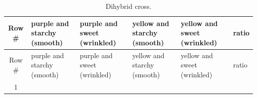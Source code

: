 \documentclass[]{book}
\theoremstyle{definition}
\theoremstyle{definition}
\theoremstyle{definition}
\theoremstyle{remark}
\begin{document}
\begin{longtable}[]{@{}clllll@{}}
\caption{\label{tab:di} Dihybrid cross.}\tabularnewline
\toprule
\begin{minipage}[b]{0.05\columnwidth}\centering\strut
Row \#\strut
\end{minipage} & \begin{minipage}[b]{0.19\columnwidth}\raggedright\strut
purple and starchy (smooth)\strut
\end{minipage} & \begin{minipage}[b]{0.19\columnwidth}\raggedright\strut
purple and sweet (wrinkled)\strut
\end{minipage} & \begin{minipage}[b]{0.19\columnwidth}\raggedright\strut
yellow and starchy (smooth)\strut
\end{minipage} & \begin{minipage}[b]{0.19\columnwidth}\raggedright\strut
yellow and sweet (wrinkled)\strut
\end{minipage} & \begin{minipage}[b]{0.04\columnwidth}\raggedright\strut
ratio\strut
\end{minipage}\tabularnewline
\midrule
\endfirsthead
\toprule
\begin{minipage}[b]{0.05\columnwidth}\centering\strut
Row \#\strut
\end{minipage} & \begin{minipage}[b]{0.19\columnwidth}\raggedright\strut
purple and starchy (smooth)\strut
\end{minipage} & \begin{minipage}[b]{0.19\columnwidth}\raggedright\strut
purple and sweet (wrinkled)\strut
\end{minipage} & \begin{minipage}[b]{0.19\columnwidth}\raggedright\strut
yellow and starchy (smooth)\strut
\end{minipage} & \begin{minipage}[b]{0.19\columnwidth}\raggedright\strut
yellow and sweet (wrinkled)\strut
\end{minipage} & \begin{minipage}[b]{0.04\columnwidth}\raggedright\strut
ratio\strut
\end{minipage}\tabularnewline
\midrule
\endhead
\begin{minipage}[t]{0.05\columnwidth}\centering\strut
1\strut
\end{minipage} & \begin{minipage}[t]{0.19\columnwidth}\raggedright\strut

\end{minipage}
\end{longtable}
\end{document}
